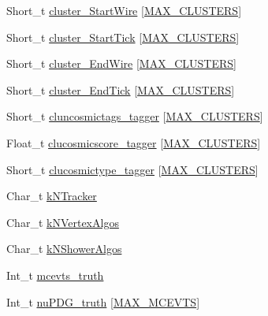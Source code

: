\begin{DoxyCompactItemize}
\item 
Short\-\_\-t \hyperlink{classanatree_a182c7fb3a2086ad0373d522e931f82c7}{cluster\-\_\-\-Start\-Wire} \mbox{[}\hyperlink{anatree__core__v09410002_8h_a7250daa0fff832693cecd6907e64f6ec}{M\-A\-X\-\_\-\-C\-L\-U\-S\-T\-E\-R\-S}\mbox{]}
\item 
Short\-\_\-t \hyperlink{classanatree_a401ba755fe4050cb3fdd2c432374abb5}{cluster\-\_\-\-Start\-Tick} \mbox{[}\hyperlink{anatree__core__v09410002_8h_a7250daa0fff832693cecd6907e64f6ec}{M\-A\-X\-\_\-\-C\-L\-U\-S\-T\-E\-R\-S}\mbox{]}
\item 
Short\-\_\-t \hyperlink{classanatree_a44f1514692e996efab1aa5e025540ff3}{cluster\-\_\-\-End\-Wire} \mbox{[}\hyperlink{anatree__core__v09410002_8h_a7250daa0fff832693cecd6907e64f6ec}{M\-A\-X\-\_\-\-C\-L\-U\-S\-T\-E\-R\-S}\mbox{]}
\item 
Short\-\_\-t \hyperlink{classanatree_a43b238c8923fbf44a4e02c6c615ba82e}{cluster\-\_\-\-End\-Tick} \mbox{[}\hyperlink{anatree__core__v09410002_8h_a7250daa0fff832693cecd6907e64f6ec}{M\-A\-X\-\_\-\-C\-L\-U\-S\-T\-E\-R\-S}\mbox{]}
\item 
Short\-\_\-t \hyperlink{classanatree_a9c829d190955933229088e452846ea7b}{cluncosmictags\-\_\-tagger} \mbox{[}\hyperlink{anatree__core__v09410002_8h_a7250daa0fff832693cecd6907e64f6ec}{M\-A\-X\-\_\-\-C\-L\-U\-S\-T\-E\-R\-S}\mbox{]}
\item 
Float\-\_\-t \hyperlink{classanatree_a0ffbb34cd1be47925f21fe56c6d3a9e4}{clucosmicscore\-\_\-tagger} \mbox{[}\hyperlink{anatree__core__v09410002_8h_a7250daa0fff832693cecd6907e64f6ec}{M\-A\-X\-\_\-\-C\-L\-U\-S\-T\-E\-R\-S}\mbox{]}
\item 
Short\-\_\-t \hyperlink{classanatree_ae283ea887bcf0e7daafd4b4966caa63b}{clucosmictype\-\_\-tagger} \mbox{[}\hyperlink{anatree__core__v09410002_8h_a7250daa0fff832693cecd6907e64f6ec}{M\-A\-X\-\_\-\-C\-L\-U\-S\-T\-E\-R\-S}\mbox{]}
\item 
Char\-\_\-t \hyperlink{classanatree_a264df42fa5b588baa256455dbb47c3bc}{k\-N\-Tracker}
\item 
Char\-\_\-t \hyperlink{classanatree_a8596cc9fc78a3472c2a2a3a5c02416a8}{k\-N\-Vertex\-Algos}
\item 
Char\-\_\-t \hyperlink{classanatree_ac201bf34b5fd39da28bf942d8e8be027}{k\-N\-Shower\-Algos}
\item 
Int\-\_\-t \hyperlink{classanatree_a6348c95823d70c20e4d6ab3d34dc2de5}{mcevts\-\_\-truth}
\item 
Int\-\_\-t \hyperlink{classanatree_aac578b86329edeeacd7f7e06ace2db3d}{nu\-P\-D\-G\-\_\-truth} \mbox{[}\hyperlink{anatree__core__v09410002_8h_aaa5b2c5d6288820484963683ee7c31aa}{M\-A\-X\-\_\-\-M\-C\-E\-V\-T\-S}\mbox{]}

\end{DoxyCompactItemize}
